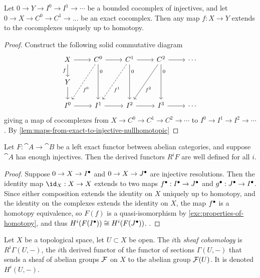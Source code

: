 \begin{cor}
	Let $0 \to Y \to I^0 \to I^1 \to \cdots$ be a bounded cocomplex of injectives, and let $0 \to X \to C^0 \to C^1 \to ...$ be an exact cocomplex. Then any map $f: X \to Y$ extends to the cocomplexes uniquely up to homotopy. 
\end{cor}
\begin{proof}
Construct the following solid commutative diagram 	
\[\begin{tikzcd}
	X & {C^0} & {C^1} & {C^2} & \cdots \\
	Y \\
	{I^0} & {I^1} & {I^2} & {I^3} & \cdots
	\arrow[from=1-1, to=1-2]
	\arrow["f"', from=1-1, to=2-1]
	\arrow[from=1-2, to=1-3]
	\arrow["{f^0}"{pos=0.6}, dashed, from=1-2, to=3-1]
	\arrow["0"{pos=0.2}, from=1-2, to=3-2]
	\arrow[from=1-3, to=1-4]
	\arrow["{f^1}"{pos=0.6}, dashed, from=1-3, to=3-2]
	\arrow["0"{pos=0.2}, from=1-3, to=3-3]
	\arrow[from=1-4, to=1-5]
	\arrow["{f^2}"{pos=0.6}, from=1-4, to=3-3]
	\arrow["0"{pos=0.2}, from=1-4, to=3-4]
	\arrow[from=2-1, to=3-1]
	\arrow[from=3-1, to=3-2]
	\arrow[from=3-2, to=3-3]
	\arrow[from=3-3, to=3-4]
	\arrow[from=3-4, to=3-5]
\end{tikzcd}\]
giving a map of cocomplexes from $X \to C^0 \to C^1 \to C^2 \to \cdots$ to $I^0 \to I^1 \to I^2 \to \cdots$. 
By \cref{lem:maps-from-exact-to-injective-nullhomotopic} 
\end{proof}

\begin{cor}
	Let $F: \cat A \to \cat B$ be a left exact functor between abelian categories, and suppose $\cat A$ has enough injectives. Then the derived functors $R^iF$ are well defined for all $i$. 
\end{cor}
\begin{proof}
	Suppose $0 \to X \to {I}^\bullet$ and $0 \to X \to {J}^\bullet$ are injective resolutions. Then the identity map $\id_X: X \to X$ extends to two maps ${f}^\bullet: {I}^\bullet \to {J}^\bullet$ and ${g}^\bullet: {J}^\bullet \to {I}^\bullet$. Since either composition extends the identity on $X$ uniquely up to homotopy, and the identity on the complexes extends the identity on $X$, the map ${f}^\bullet$ is a homotopy equivalence, so $F(f)$ is a quasi-isomorphism by \cref{exc:properties-of-homotopy}, and thus $H^i(F({I}^\bullet)) \cong H^i(F({J}^\bullet))$. .
\end{proof}

\begin{defn}
	Let $X$ be a topological space, let $U \subset X$ be open. 
	The $i$th \emph{sheaf cohomology}  is $R^i \Gamma(U, -)$, the $i$th derived functor of the functor of sections $\Gamma(U, -)$ that sends a sheaf of abelian groups $\mathcal{F}$ on $X$ to the abelian group $\mathcal{F}(U)$. It is denoted $H^i(U, -)$.
\end{defn}
